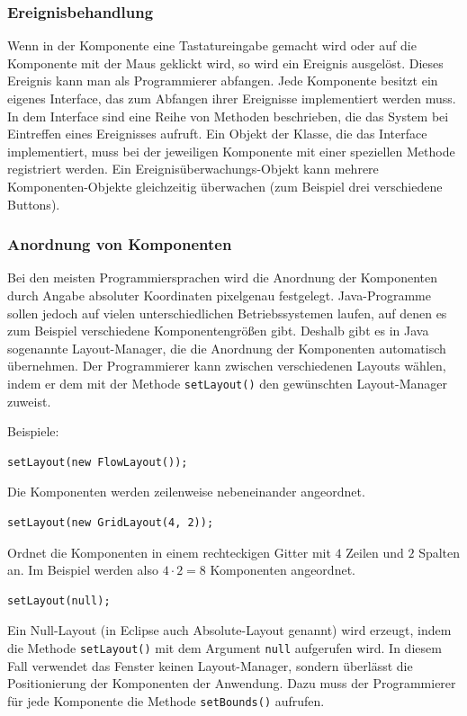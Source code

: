 \subsubsection{Ereignisbehandlung}

Wenn in der Komponente eine Tastatureingabe gemacht wird oder auf die Komponente
mit der Maus geklickt wird, so wird ein Ereignis ausgelöst. Dieses Ereignis
kann man als Programmierer abfangen. Jede Komponente besitzt ein eigenes
Interface, das zum Abfangen ihrer Ereignisse implementiert werden muss. In dem
Interface sind eine Reihe von Methoden beschrieben, die das System bei
Eintreffen eines Ereignisses aufruft. Ein Objekt der Klasse, die das Interface
implementiert, muss bei der jeweiligen Komponente mit einer speziellen Methode
registriert werden. Ein \glqq Ereignisüberwachungs\grqq -Objekt kann mehrere
Komponenten-Objekte gleichzeitig überwachen (zum Beispiel drei verschiedene
Buttons).

\subsubsection{Anordnung von Komponenten}

Bei den meisten Programmiersprachen wird die Anordnung der Komponenten durch
Angabe absoluter Koordinaten pixelgenau festgelegt. Java-Programme sollen
jedoch auf vielen unterschiedlichen Betriebssystemen laufen, auf denen es zum
Beispiel verschiedene Komponentengrößen gibt. Deshalb gibt es in Java sogenannte
Layout-Manager, die die Anordnung der Komponenten automatisch übernehmen. Der
Programmierer kann zwischen verschiedenen Layouts wählen, indem er dem
 mit der Methode \lstinline|setLayout()| den gewünschten
Layout-Manager zuweist.

Beispiele:

\begin{compactenum}[a)]
\item
\begin{lstlisting}
setLayout(new FlowLayout());
\end{lstlisting}
Die Komponenten werden zeilenweise nebeneinander angeordnet.

\item
\begin{lstlisting}
setLayout(new GridLayout(4, 2));
\end{lstlisting}
Ordnet die Komponenten in einem rechteckigen Gitter mit $4$ Zeilen und $2$ Spalten
an. Im Beispiel werden also $4 \cdot 2 = 8$ Komponenten angeordnet.

\item
\begin{lstlisting}
setLayout(null);
\end{lstlisting}
Ein Null-Layout (in Eclipse auch Absolute-Layout genannt) wird erzeugt, indem
die Methode \lstinline|setLayout()| mit dem Argument \lstinline|null| aufgerufen
wird. In diesem Fall verwendet das Fenster keinen Layout-Manager, sondern
überlässt die Positionierung der Komponenten der Anwendung. Dazu muss der
Programmierer für jede Komponente die Methode \lstinline|setBounds()| aufrufen.
\end{compactenum}

